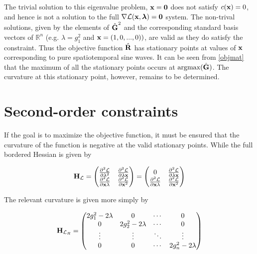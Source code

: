 \documentclass{article}
\newcommand{\Lagr}{\mathcal{L}}
\newcommand{\R}{\mathbb{R}}
\newcommand{\vect}[1]{\textbf{\textrm{#1}}}
\newcommand{\pdd}[2]{\frac{\partial^2 {#1}}{\partial {#2}}}
\begin{document}
The trivial solution to this eigenvalue problem, $\vect{x} = \vect{0}$ does not satisfy $c(\vect{x}) = 0$, and hence is not a solution to the full $\nabla \Lagr(\vect{x},\bm{\lambda}) = \vect{0}$ system.
The non-trival solutions, given by the elements of $\hat{\vect{G}}^2$ and the corresponding standard basis vectors of $\R^n$ (e.g. $\lambda = g_1^2$ and $\vect{x} = (1, 0, ..., 0))$, are valid as they do satisfy the constraint. 
Thus the objective function $\hat{\vect{R}}$ has stationary points at values of $\vect{x}$ corresponding to pure spatiotemporal sine waves.
It can be seen from \eqref{objmat} that the maximum of all the stationary points occurs at $\text{argmax}(\hat{\vect{G}})$.
The curvature at this stationary point, however, remains to be determined.


\section{Second-order constraints} \label{soc}
If the goal is to maximize the objective function, it must be ensured that the curvature of the function is negative at the valid stationary points. While the full bordered Hessian is given by

\begin{equation} \label{lagrhessian}
	\vect{H}_\Lagr = 
	\begin{pmatrix}
		\pdd{\Lagr}{\lambda^2} & \pdd{\Lagr}{\lambda\vect{x}} \\
		\pdd{\Lagr}{\vect{x}\lambda} & \pdd{\Lagr}{\vect{x}^2}
	\end{pmatrix} = 
	\begin{pmatrix}
		0 & \pdd{\Lagr}{\lambda\vect{x}} \\
		\pdd{\Lagr}{\vect{x}\lambda} & \pdd{\Lagr}{\vect{x}^2}
	\end{pmatrix}
\end{equation}

The relevant curvature is given more simply by

\begin{equation}
	\vect{H}_{\Lagr_R} =
	\begin{pmatrix}
		2g_1^2 - 2\lambda & 0 & \cdots & 0 \\
		0 & 2g_2^2 - 2\lambda & \cdots & 0 \\
		\vdots & \vdots & \ddots & \vdots \\
		0 & 0 & \cdots & 2g_n^2 - 2\lambda
	\end{pmatrix} \nonumber
\end{equation}
\end{document}
